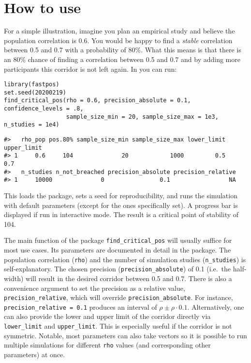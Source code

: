 \hypertarget{how-to-use}{%
\section{\texorpdfstring{How to use }{How to use }}\label{how-to-use}}

For a simple illustration, imagine you plan an empirical study and believe the population correlation is 0.6. You would be happy to find a \emph{stable} correlation between 0.5 and 0.7 with a probability of 80\%. What this means is that there is an 80\% chance of finding a correlation between 0.5 and 0.7 and by adding more participants this corridor is not left again. In  you can run:

\begin{verbatim}
library(fastpos)
set.seed(20200219)
find_critical_pos(rho = 0.6, precision_absolute = 0.1, confidence_levels = .8,
                  sample_size_min = 20, sample_size_max = 1e3, n_studies = 1e4)
\end{verbatim}

\begin{verbatim}
#>   rho_pop pos.80% sample_size_min sample_size_max lower_limit upper_limit
#> 1     0.6     104              20            1000         0.5         0.7
#>   n_studies n_not_breached precision_absolute precision_relative
#> 1     10000              0                0.1                 NA
\end{verbatim}

This loads the package, sets a seed for reproducibility, and runs the simulation with default parameters (except for the ones specifically set). A progress bar is displayed if run in interactive mode. The result is a critical point of stability of 104.

The main function of the package \texttt{find\_critical\_pos} will usually suffice for most use cases. Its parameters are documented in detail in the package. The population correlation (\texttt{rho}) and the number of simulation studies (\texttt{n\_studies}) is self-explanatory. The chosen precision (\texttt{precision\_absolute}) of 0.1 (i.e.~the half-width) will result in the desired corridor between 0.5 and 0.7. There is also a convenience argument to set the precision as a relative value, \texttt{precision\_relative}, which will override \texttt{precision\_absolute}. For instance, \texttt{precision\_relative\ =\ 0.1} produces an interval of \(\rho \pm \rho \cdot 0.1\). Alternatively, one can also provide the lower and upper limit of the corridor directly via \texttt{lower\_limit} and \texttt{upper\_limit}. This is especially useful if the corridor is not symmetric. Notable, most parameters can also take vectors so it is possible to run multiple simulations for different \texttt{rho} values (and corresponding other parameters) at once.

